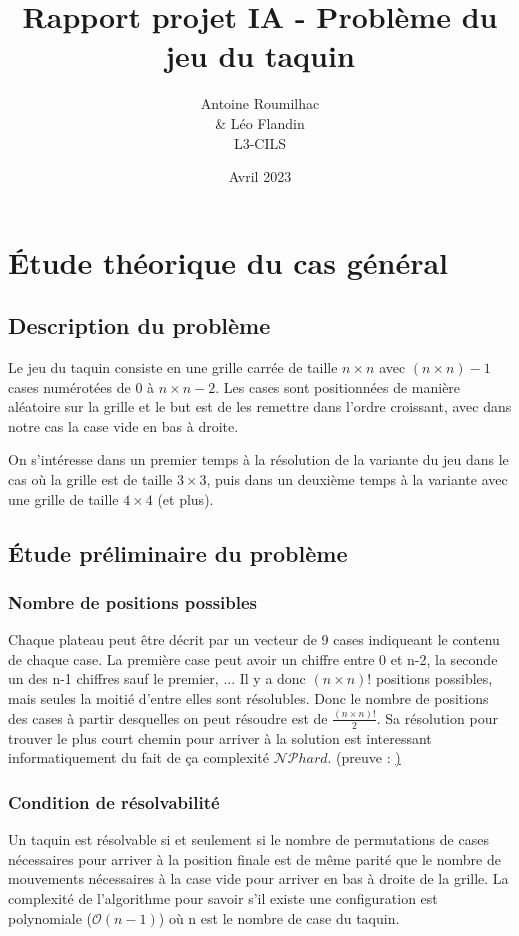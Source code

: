 \documentclass[a4paper, 12pt]{article}
\title{Rapport projet IA - Problème du jeu du taquin}
\author{Antoine Roumilhac\\
    \& Léo Flandin\\
    L3-CILS}
\date{Avril 2023}
\begin{document}
\maketitle

\section{Étude théorique du cas général}

\subsection{Description du problème}
Le jeu du taquin consiste en une grille carrée de taille $n\times n$ avec $(n\times n) - 1$ cases numérotées de 0 à $n \times n - 2$.
Les cases sont positionnées de manière aléatoire sur la grille et le but est de les remettre dans l'ordre croissant, avec dans notre cas la case vide en bas à droite.


On s'intéresse dans un premier temps à la résolution de la variante du jeu dans le cas où la grille est de taille $3 \times 3$, puis dans un deuxième temps à la variante avec une grille de taille $4 \times 4$ (et plus).

\subsection{Étude préliminaire du problème}

\subsubsection{Nombre de positions possibles}
Chaque plateau peut être décrit par un vecteur de 9 cases indiqueant le contenu de chaque case. La première case peut avoir un chiffre entre 0 et n-2, la seconde un des n-1 chiffres sauf le premier, ...
Il y a donc $(n \times n)!$ positions possibles, mais seules la moitié d'entre elles sont résolubles.
Donc le nombre de positions des cases à partir desquelles on peut résoudre est de $\frac{(n\times n)!}{2}$.
Sa résolution pour trouver le plus court chemin pour arriver à la solution est interessant informatiquement du fait de ça complexité $\mathcal{NP}hard$. (preuve : \href{https://cdn.aaai.org/AAAI/1986/AAAI86-027.pdf})
\subsubsection{Condition de résolvabilité}
Un taquin est résolvable si et seulement si le nombre de permutations de cases nécessaires pour arriver à la position finale est de même parité que le nombre de mouvements nécessaires à la case vide pour arriver en bas à droite de la grille.
La complexité de l'algorithme pour savoir s'il existe une configuration est polynomiale ($\mathcal{O}(n-1)$) où n est le nombre de case du taquin.
\end{document}
